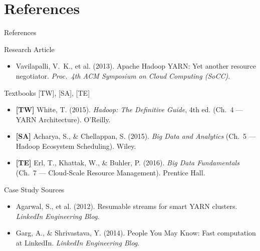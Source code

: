 \documentclass[aspectratio=169,10pt]{beamer}
\begin{document}
\section*{References}

\begin{frame}{References}
  \begin{block}{Research Article}
    \begin{itemize}
      \item Vavilapalli, V.~K., et al. (2013).
            Apache Hadoop YARN: Yet another resource negotiator.
            \textit{Proc.\ 4th ACM Symposium on Cloud Computing (SoCC)}.
    \end{itemize}
  \end{block}
  \vspace{4pt}
  \begin{block}{Textbooks \textmd{[TW], [SA], [TE]}}
    \begin{itemize}
      \item \textbf{[TW]} White, T. (2015).
            \textit{Hadoop: The Definitive Guide}, 4th ed.
            (Ch.~4 — YARN Architecture). O'Reilly.
      \item \textbf{[SA]} Acharya, S., \& Chellappan, S. (2015).
            \textit{Big Data and Analytics}
            (Ch.~5 — Hadoop Ecosystem Scheduling). Wiley.
      \item \textbf{[TE]} Erl, T., Khattak, W., \& Buhler, P. (2016).
            \textit{Big Data Fundamentals}
            (Ch.~7 — Cloud-Scale Resource Management). Prentice Hall.
    \end{itemize}
  \end{block}
  \vspace{4pt}
  \begin{block}{Case Study Sources}
    \begin{itemize}
      \item Agarwal, S., et al. (2012).
            Resumable streams for smart YARN clusters.
            \textit{LinkedIn Engineering Blog}.
      \item Garg, A., \& Shrivastava, Y. (2014).
            People You May Know: Fast computation at LinkedIn.
            \textit{LinkedIn Engineering Blog}.
    \end{itemize}
  \end{block}
\end{frame}
\end{document}
